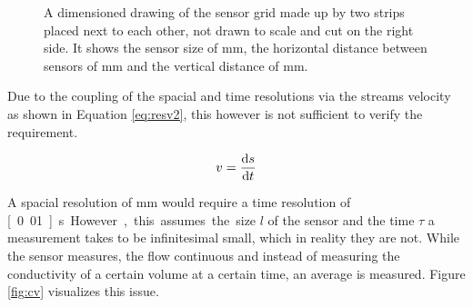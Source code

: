 \begin{figure}[H]
\begin{center}
		\caption{A dimensioned drawing of the sensor grid made up by two strips placed next to each other, not drawn to scale and cut on the right side. It shows the sensor size of \unit[10x11]{mm}, the horizontal distance between sensors of \unit[50]{mm} and the vertical distance of \unit[25]{mm}.}
		\label{fig:sensarray}
	\end{center}
\end{figure}

Due to the coupling of the spacial and time resolutions via the streams velocity as shown in Equation \eqref{eq:resv2}, this however is not sufficient to verify the requirement. 

\begin{equation}
	v = \dfrac{\mathop{}\!\mathrm{d} s}{\mathop{}\!\mathrm{d} t}
\label{eq:resv2} 
\end{equation}

A spacial resolution of \unit[10]{mm} would require a time resolution of \unit[0.01]{s}. However, this assumes the size $ l $ of the sensor and the time $ \tau $ a measurement takes to be infinitesimal small, which in reality they are not. While the sensor measures, the flow continuous and instead of measuring the conductivity of a certain volume at a certain time, an average is measured. Figure \ref{fig:cv} visualizes this issue.

